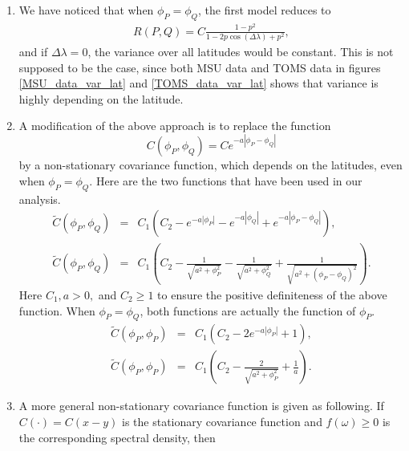 	\begin{enumerate}
		\item We have noticed that when $\phi_P = \phi_Q$, the first model reduces to
		      \begin{eqnarray*}
		      	R(P, Q) = C\frac{1-p^2}{1 - 2p\cos(\Delta\lambda)+p^2},
		      \end{eqnarray*}
		      and if $\Delta \lambda = 0$, the variance over all latitudes would be constant. This is not supposed to be the case, since both MSU data and TOMS data in figures \ref{MSU_data_var_lat} and \ref{TOMS_data_var_lat} shows that variance is highly depending on the latitude.
		\item A modification of the above approach is to replace the function
		      \[
		      	C(\phi_P, \phi_Q) = Ce^{-a|\phi_P - \phi_Q|}
		      \]
		      by a non-stationary covariance function, which depends on the latitudes, even when $\phi_P = \phi_Q$. Here are the two functions that have been used in our analysis.
		      \begin{eqnarray*}
		      	\tilde{C}(\phi_P, \phi_Q) &=& C_1(C_2 - e^{-a|\phi_P|} - e^{-a|\phi_Q|} + e^{-a|\phi_P - \phi_Q|}), \\
		      	\tilde{C}(\phi_P, \phi_Q) &=& C_1\left(C_2 - \frac{1}{\sqrt{a^2+\phi_P^2}} - \frac{1}{\sqrt{a^2+\phi_Q^2}} + \frac{1}{\sqrt{a^2+(\phi_P-\phi_Q)^2}}\right).
		      \end{eqnarray*}
		      Here $C_1, a > 0,$ and $C_2 \ge 1$ to ensure the positive definiteness of the above function. When $\phi_P = \phi_Q$, both functions are actually the function of $\phi_P$.
		      \begin{eqnarray*}
		      	\tilde{C}(\phi_P, \phi_P) &=& C_1(C_2 - 2e^{-a|\phi_P|} + 1), \\
		      	\tilde{C}(\phi_P, \phi_P) &=& C_1\left(C_2 - \frac{2}{\sqrt{a^2+\phi_P^2}} + \frac{1}{a}\right).
		      \end{eqnarray*}
		      
		\item A more general non-stationary covariance function is given as following. If $C(\cdot) = C(x-y)$ is the stationary covariance function and $f(\omega) \ge 0$ is the corresponding spectral density, then
		      

\end{enumerate}
